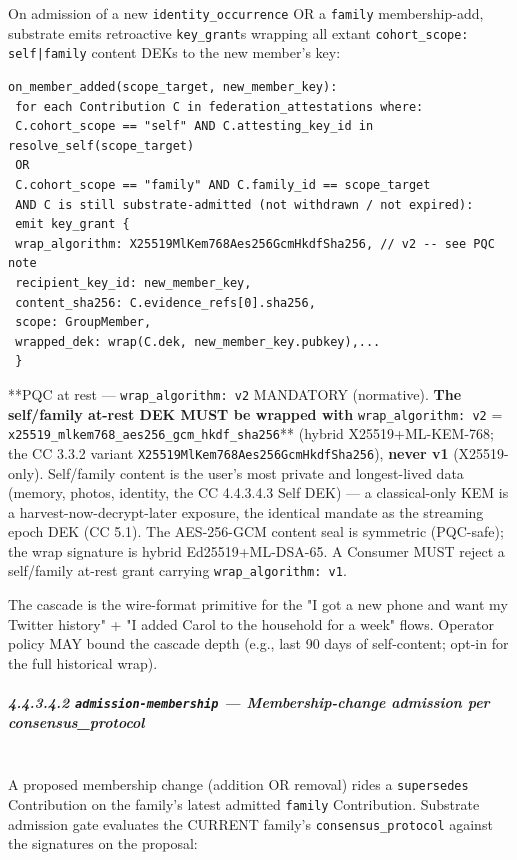 \documentclass[11pt]{article}
\begin{document}
On admission of a new \texttt{identity\_occurrence} OR a \texttt{family} membership-add, substrate emits retroactive \texttt{key\_grant}s wrapping all extant \texttt{cohort\_scope: self|family} content DEKs to the new member's key:


\begin{lstlisting}
on_member_added(scope_target, new_member_key):
 for each Contribution C in federation_attestations where:
 C.cohort_scope == "self" AND C.attesting_key_id in resolve_self(scope_target)
 OR
 C.cohort_scope == "family" AND C.family_id == scope_target
 AND C is still substrate-admitted (not withdrawn / not expired):
 emit key_grant {
 wrap_algorithm: X25519MlKem768Aes256GcmHkdfSha256, // v2 -- see PQC note
 recipient_key_id: new_member_key,
 content_sha256: C.evidence_refs[0].sha256,
 scope: GroupMember,
 wrapped_dek: wrap(C.dek, new_member_key.pubkey),...
 }
\end{lstlisting}

**PQC at rest — \texttt{wrap\_algorithm: v2} MANDATORY (normative).\textbf{ The self/family at-rest DEK MUST be wrapped with }\texttt{wrap\_algorithm: v2} = \texttt{x25519\_mlkem768\_aes256\_gcm\_hkdf\_sha256}** (hybrid X25519+ML-KEM-768; the CC 3.3.2 variant \texttt{X25519MlKem768Aes256GcmHkdfSha256}), \textbf{never v1} (X25519-only). Self/family content is the user's most private and longest-lived data (memory, photos, identity, the CC 4.4.3.4.3 Self DEK) — a classical-only KEM is a harvest-now-decrypt-later exposure, the identical mandate as the streaming epoch DEK (CC 5.1). The AES-256-GCM content seal is symmetric (PQC-safe); the wrap signature is hybrid Ed25519+ML-DSA-65. A Consumer MUST reject a self/family at-rest grant carrying \texttt{wrap\_algorithm: v1}.


The cascade is the wire-format primitive for the "I got a new phone and want my Twitter history" + "I added Carol to the household for a week" flows. Operator policy MAY bound the cascade depth (e.g., last 90 days of self-content; opt-in for the full historical wrap).


\subparagraph{4.4.3.4.2 \texttt{admission-membership} — Membership-change admission per consensus\_protocol}\mbox{}\\


A proposed membership change (addition OR removal) rides a \texttt{supersedes} Contribution on the family's latest admitted \texttt{family} Contribution. Substrate admission gate evaluates the CURRENT family's \texttt{consensus\_protocol} against the signatures on the proposal:
\end{document}
